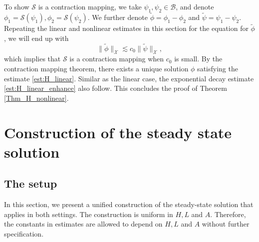 \documentclass[reqno, 11pt]{amsart}
\theoremstyle{plain}
\theoremstyle{definition}
\theoremstyle{remark}
\numberwithin{equation}{section}
\newcommand\cB{\mathcal{B}}
\newcommand\cS{\mathcal{S}}
\newcommand\cX{\mathcal{X}}
\begin{document}
To show $\cS$ is a contraction mapping, we take $\psi_1, \psi_2 \in \cB$, and denote $\phi_1 = \cS(\psi_1), \phi_2 = \cS(\psi_2)$. We further denote $\widetilde{\phi} = \phi_1 - \phi_2$ and $\widetilde{\psi} = \psi_1 - \psi_2$. Repeating the linear and nonlinear estimates in this section for the equation for $\widetilde{\phi}$, we will end up with
$$
\| \widetilde \phi\|_{\cX} \lesssim c_0 \| \widetilde \psi\|_{\cX},
$$
which implies that $\cS$ is a contraction mapping when $c_0$ is small. By the contraction mapping theorem, there exists a unique solution $\phi$ satisfying the estimate \eqref{est:H_linear}. Similar as the linear case, the exponential decay estimate \eqref{est:H_linear_enhance} also follow. This concludes the proof of Theorem \ref{Thm_H_nonlinear}.




\section{Construction of the steady state solution}\label{sec:construction}


\subsection{The setup}

In this section, we present a unified construction of the steady-state solution that applies in both settings. The construction is uniform in $H, L$ and $A$. Therefore, the constants in estimates are allowed to depend on $H, L$ and $A$ without further specification.
\end{document}
